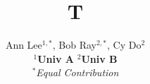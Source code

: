 \documentclass{article}
\begin{document}
\title{T}
\author{Ann Lee$^{1,*}$, Bob Ray$^{2,*}$, Cy Do$^{2}$\\
\textbf{$^1$Univ A}  \textbf{$^2$Univ B}\\
\textit{$^*$Equal Contribution}}
\maketitle
\end{document}
